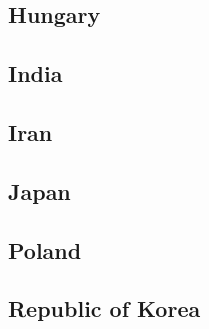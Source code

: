 \documentclass[../the-book.tex]{subfiles}
\begin{document}





\subsection*{Hungary}






\subsection*{India}







\subsection*{Iran}











\subsection*{Japan}





\subsection*{Poland}




\subsection*{Republic of Korea}




\end{document}
